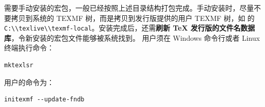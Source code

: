 需要手动安装的宏包，一般已经按照上述目录结构打包完成。手动安装时，尽量不要拷贝到系统的 TEXMF 树，而是拷贝到发行版提供的用户 TEXMF 树，如
 的 \nolinkurl{C:\\texlive\\texmf-local}。安装完成后，还需\textbf{刷新 \TeX{} 发行版的文件名数据库}，令新安装的宏包文件能够被系统找到。
 用户须在 Windows 命令行或者 Linux 终端执行命令：
\begin{verbatim}
mktexlsr
\end{verbatim}
 用户的命令为：
\begin{verbatim}
initexmf --update-fndb
\end{verbatim}

\endinput
